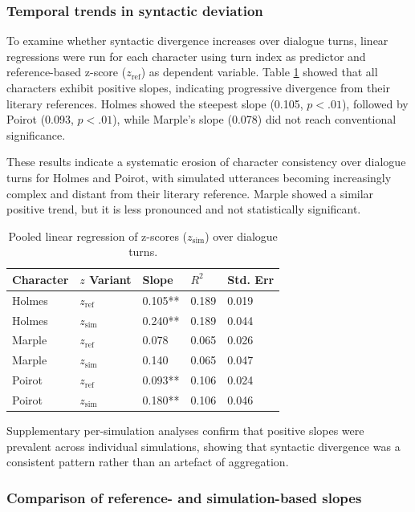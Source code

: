 \documentclass{article}
\begin{document}
\subsubsection{Temporal trends in syntactic deviation}

To examine whether syntactic divergence increases over dialogue turns, linear regressions were run for each character using turn index as predictor and reference-based z-score ($z_{\mathrm{ref}}$) as dependent variable. Table \ref{tab:syntax_regression} showed that all characters exhibit positive slopes, indicating progressive divergence from their literary references. Holmes showed the steepest slope (0.105, $p<.01$), followed by Poirot (0.093, $p<.01$), while Marple's slope (0.078) did not reach conventional significance.

These results indicate a systematic erosion of character consistency over dialogue turns for Holmes and Poirot, with simulated utterances becoming increasingly complex and distant from their literary reference. Marple showed a similar positive trend, but it is less pronounced and not statistically significant.

\begin{table}[H]
\centering
\begin{tabular}{l l l l l}\toprule
Character & $z$ Variant& Slope & $R^2$& Std. Err \\\midrule
Holmes & $z_{\mathrm{ref}}$& 0.105** & 0.189 & 0.019 \\
Holmes & $z_{\mathrm{sim}}$& 0.240** & 0.189 & 0.044 \\
Marple & $z_{\mathrm{ref}}$& 0.078 & 0.065 & 0.026 \\
Marple & $z_{\mathrm{sim}}$& 0.140 & 0.065 & 0.047 \\
Poirot & $z_{\mathrm{ref}}$& 0.093** & 0.106 & 0.024 \\
Poirot & $z_{\mathrm{sim}}$& 0.180** & 0.106 & 0.046 \\ \bottomrule
\end{tabular}
\caption{Pooled linear regression of z-scores ($z_{\mathrm{sim}}$) over dialogue turns.}
\label{tab:syntax_regression}
\end{table}

Supplementary per-simulation analyses confirm that positive slopes were prevalent across individual simulations, showing that syntactic divergence was a consistent pattern rather than an artefact of aggregation.

\subsubsection{Comparison of reference- and simulation-based slopes}
\end{document}
